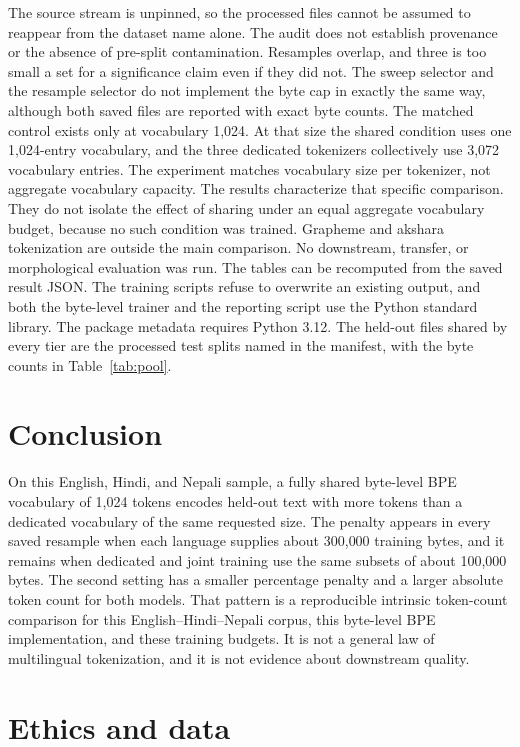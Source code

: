 \documentclass[10pt,twocolumn]{article}
\begin{document}
The source stream is unpinned, so the processed files cannot be assumed to reappear from the dataset name alone.
The audit does not establish provenance or the absence of pre-split contamination.
Resamples overlap, and three is too small a set for a significance claim even if they did not.
The sweep selector and the resample selector do not implement the byte cap in exactly the same way, although both saved files are reported with exact byte counts.
The matched control exists only at vocabulary 1{,}024.
At that size the shared condition uses one 1{,}024-entry vocabulary, and the three dedicated tokenizers collectively use 3{,}072 vocabulary entries.
The experiment matches vocabulary size per tokenizer, not aggregate vocabulary capacity.
The results characterize that specific comparison.
They do not isolate the effect of sharing under an equal aggregate vocabulary budget, because no such condition was trained.
Grapheme and akshara tokenization are outside the main comparison.
No downstream, transfer, or morphological evaluation was run.
The tables can be recomputed from the saved result JSON.
The training scripts refuse to overwrite an existing output, and both the byte-level trainer and the reporting script use the Python standard library.
The package metadata requires Python 3.12.
The held-out files shared by every tier are the processed test splits named in the manifest, with the byte counts in Table~\ref{tab:pool}.

\section{Conclusion}

On this English, Hindi, and Nepali sample, a fully shared byte-level BPE vocabulary of 1{,}024 tokens encodes held-out text with more tokens than a dedicated vocabulary of the same requested size.
The penalty appears in every saved resample when each language supplies about 300{,}000 training bytes, and it remains when dedicated and joint training use the same subsets of about 100{,}000 bytes.
The second setting has a smaller percentage penalty and a larger absolute token count for both models.
That pattern is a reproducible intrinsic token-count comparison for this English--Hindi--Nepali corpus, this byte-level BPE implementation, and these training budgets.
It is not a general law of multilingual tokenization, and it is not evidence about downstream quality.

\section*{Ethics and data}
\end{document}
